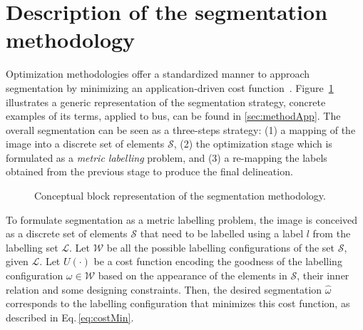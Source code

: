 \graphicspath{{./content/method/figures/visual_cues/}{./content/method/figures/}{./content/method/figures/method_highlights/}}

\section{Description of the segmentation methodology}\label{sec:method}

Optimization methodologies offer a standardized manner to approach segmentation by minimizing an application-driven cost function~\cite{cremers2007review}.
Figure~\ref{fig:method} illustrates a generic representation of the segmentation strategy,
concrete examples of its terms, applied to \ac{bus}, can be found in \cref{sec:methodApp}.
The overall segmentation can be seen as a three-steps strategy:
(1) a mapping of the image into a discrete set of elements $\mathcal{S}$,
(2) the optimization stage which is formulated as a \emph{metric labelling} problem,
and (3) a re-mapping the labels obtained from the previous stage to produce the final delineation.


\begin{figure}[htpb]
  \scriptsize
  \centering
  
  \caption{Conceptual block representation of the segmentation methodology.}%
  \label{fig:method}
\end{figure}


To formulate segmentation as a metric labelling problem, the image is conceived as a discrete set of elements $\mathcal{S}$ that need to be labelled using a label $l$ from the labelling set $\mathcal{L}$.
Let $\mathcal{W}$ be all the possible labelling configurations of the set $\mathcal{S}$, given $\mathcal{L}$.
Let $U(\cdot)$ be a cost function encoding the goodness of the labelling configuration $\omega \in \mathcal{W}$ based on the appearance of the elements in $\mathcal{S}$, their inner relation and some designing constraints.
Then, the desired segmentation $\hat{\omega}$ corresponds to the labelling configuration that minimizes this cost function, as described in Eq.\,\eqref{eq:costMin}.

